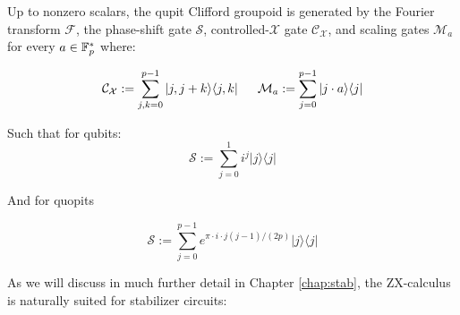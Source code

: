 \begin{lemma}
Up to nonzero scalars, the qupit Clifford groupoid is generated by the Fourier transform $\mathcal F$, the  phase-shift gate $\mathcal S$, controlled-$\mathcal X$ gate $\mathcal{C}_{\mathcal X}$, and scaling gates $\mathcal{M}_a$ for every $a \in \mathbb{F}_p^*$ where:


$$
\mathcal{C}_{\mathcal X}:= \sum_{j,k=0}^{p-1} |j,j+k \rangle \langle j,k |\, \hspace*{.5cm}
\mathcal{M}_a := \sum_{j=0}^{p-1} |j\cdot a \rangle\langle j |
$$ 

Such that for qubits:
$$
\mathcal{S}:= \sum_{j=0}^{1} i^j |j\rangle\langle j |
$$


And for quopits

$$
\mathcal{S}:= \sum_{j=0}^{p-1} e^{\pi\cdot i \cdot j(j-1)/(2p)} |j\rangle\langle j |
$$
\end{lemma}


As we will discuss in much further detail in Chapter \ref{chap:stab}, the ZX-calculus is naturally suited for stabilizer circuits:


